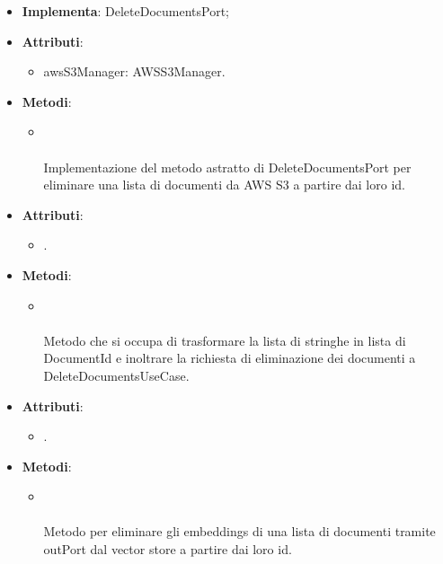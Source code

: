 \documentclass[10pt, a4paper]{article}
\begin{document}
\label{DeleteDocumentsAWSS3Dettaglio}
\begin{itemize}
    \item \textbf{Implementa}: DeleteDocumentsPort;
    \item \textbf{Attributi}:
    \begin{itemize}
        \item awsS3Manager: AWSS3Manager.
    \end{itemize}
    \item \textbf{Metodi}:
    \begin{itemize}
        \item {}\\ \\
        Implementazione del metodo astratto di DeleteDocumentsPort per eliminare una lista di documenti da AWS S3 a partire dai loro id.
    \end{itemize}
\end{itemize}


\label{DeleteDocumentsControllerDettaglio}
\begin{itemize}
    \item \textbf{Attributi}:
    \begin{itemize}
        \item {}.
    \end{itemize}
    \item \textbf{Metodi}:
    \begin{itemize}
        \item {}\\ \\
        Metodo che si occupa di trasformare la lista di stringhe in lista di DocumentId e inoltrare la richiesta di eliminazione dei documenti a DeleteDocumentsUseCase.
    \end{itemize}
\end{itemize}

\label{DeleteDocumentsEmbeddingsDettaglio}
\begin{itemize}
    \item \textbf{Attributi}:
    \begin{itemize}
        \item {}. 
    \end{itemize}
    \item \textbf{Metodi}:
    \begin{itemize}
        \item {}\\ \\
        Metodo per eliminare gli embeddings di una lista di documenti tramite outPort dal vector store a partire dai loro id.
    \end{itemize}
\end{itemize}
\end{document}
